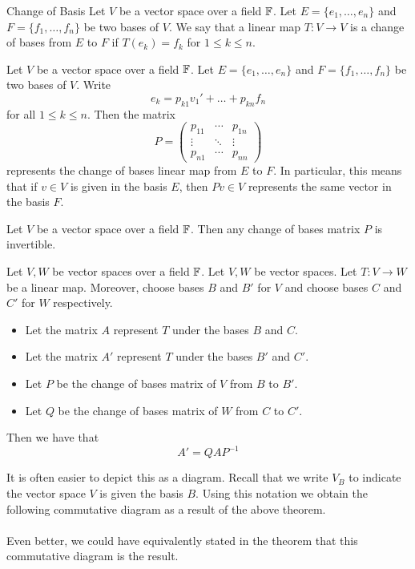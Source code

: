 \documentclass[a4paper]{article}
\begin{document}
\begin{defn}{Change of Basis}{} Let $V$ be a vector space over a field $\mathbb{F}$. Let $E=\{e_1,\dots,e_n\}$ and $F=\{f_1,\dots,f_n\}$ be two bases of $V$. We say that a linear map $T:V\to V$ is a change of bases from $E$ to $F$ if $T(e_k)=f_k$ for $1\leq k\leq n$. 
\end{defn}

\begin{prp}{}{} Let $V$ be a vector space over a field $\mathbb{F}$. Let $E=\{e_1,\dots,e_n\}$ and $F=\{f_1,\dots,f_n\}$ be two bases of $V$. Write $$e_k=p_{k1}v_1'+\dots+p_{kn}f_n$$ for all $1\leq k\leq n$. Then the matrix $$P=\begin{pmatrix}
p_{11}&\cdots&p_{1n}\\
\vdots&\ddots&\vdots\\
p_{n1}&\cdots&p_{nn}
\end{pmatrix}$$ represents the change of bases linear map from $E$ to $F$. In particular, this means that if $v\in V$ is given in the basis $E$, then $Pv\in V$ represents the same vector in the basis $F$. 
\end{prp}

\begin{lmm}{}{} Let $V$ be a vector space over a field $\mathbb{F}$. Then any change of bases matrix $P$ is invertible. 
\end{lmm}

\begin{thm}{}{} Let $V,W$ be vector spaces over a field $\mathbb{F}$. Let $V,W$ be vector spaces. Let $T:V\to W$ be a linear map. Moreover, choose bases $B$ and $B'$ for $V$ and choose bases $C$ and $C'$ for $W$ respectively. 
\begin{itemize}
\item Let the matrix $A$ represent $T$ under the bases $B$ and $C$. 
\item Let the matrix $A'$ represent $T$ under the bases $B'$ and $C'$. 
\item Let $P$ be the change of bases matrix of $V$ from $B$ to $B'$. 
\item Let $Q$ be the change of bases matrix of $W$ from $C$ to $C'$. 
\end{itemize}
Then we have that $$A'=QAP^{-1}$$
\end{thm}

It is often easier to depict this as a diagram. Recall that we write $V_B$ to indicate the vector space $V$ is given the basis $B$. Using this notation we obtain the following commutative diagram as a result of the above theorem. \\
\\
Even better, we could have equivalently stated in the theorem that this commutative diagram is the result. 
\end{document}
